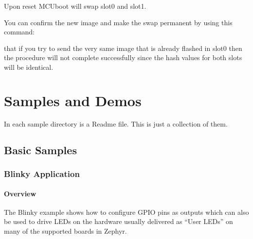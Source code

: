 \documentclass[letterpaper,10pt,english]{sphinxmanual}
\begin{document}
\begin{sphinxVerbatim}[commandchars=\\\{\}]
\end{sphinxVerbatim}

Upon reset MCUboot will swap slot\sphinxhyphen{}0 and slot\sphinxhyphen{}1.

You can confirm the new image and make the swap permanent by using this command:

\begin{sphinxVerbatim}[commandchars=\\\{\}]
\end{sphinxVerbatim}

 that if you try to send the very same image that is already flashed in
slot\sphinxhyphen{}0 then the procedure will not complete successfully since the hash values
for both slots will be identical.


\chapter{Samples and Demos}
\label{\detokenize{samples/index:samples-and-demos}}\label{\detokenize{samples/index:id1}}\label{\detokenize{samples/index::doc}}
In each sample directory is a Readme file.
This is just a collection of them.


\section{Basic Samples}
\label{\detokenize{samples/basic/basic:basic-samples}}\label{\detokenize{samples/basic/basic:basic-sample}}\label{\detokenize{samples/basic/basic::doc}}

\subsection{Blinky Application}
\label{\detokenize{samples/basic/blinky/README:blinky-application}}\label{\detokenize{samples/basic/blinky/README:blinky-sample}}\label{\detokenize{samples/basic/blinky/README::doc}}

\subsubsection{Overview}
\label{\detokenize{samples/basic/blinky/README:overview}}
The Blinky example shows how to configure GPIO pins as outputs which can also be
used to drive LEDs on the hardware usually delivered as “User LEDs” on many of
the supported boards in Zephyr.
\end{document}
